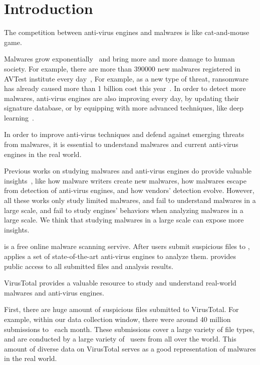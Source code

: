 \section{Introduction}
\label{sec:intro}



The competition between anti-virus engines and malwares is like cat-and-mouse game. 

Malwares grow exponentially~\cite{avtest} and bring more and more damage to human society. 
For example, there are more than 390000 new malwares registered in AVTest institute every day~\cite{avtest}, 
For example, as a new type of threat, ransomware has already caused more than 1 billion cost this year~\cite{ransomware}. 
In order to detect more malwares, anti-virus engines are also improving every day, 
by updating their signature database, 
or by equipping with more advanced techniques, like deep learning~\cite{cylance}. 

In order to improve anti-virus techniques and defend against emerging threats from malwares, 
it is essential to understand malwares and current anti-virus engines in the real world. 

Previous works on studying malwares and anti-virus engines do provide valuable 
insights~\cite{ZhouSP2012,GuptaComsnets2009, vendors-study}, like  
how malware writers create new malwares, how malwares escape from detection of anti-virus engines, 
and how vendors' detection evolve. 
However, all these works only study limited malwares, 
and fail to understand malwares in a large scale, 
and fail to study engines' behaviors when analyzing malwares in a large scale. 
We think that studying malwares in a large scale can expose more insights. 

\vt{} is a free online malware scanning servive.
After users submit suspicious files to \vt{}, \vt{} applies a set of state-of-the-art anti-virus engines to analyze them. 
\vt{} provides public access to all submitted files and analysis results. 


VirusTotal provides a valuable resource to study and 
understand real-world malwares and anti-virus engines. 

First, there are huge amount of suspicious files submitted to VirusTotal. 
For example, within our data collection window, 
there were around 40 million submissions to \vt\ each month. 
These submissions cover a large variety of file types, and 
are conducted by a large variety of \vt\ users from all over the world. 
This amount of diverse data on VirusTotal serves as a good representation of malwares in the real world.  

